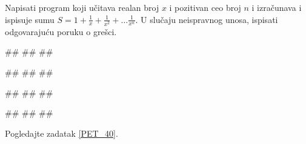 \begin{Exercise}[label=PET_41]
Napisati program koji učitava realan broj $x$ i pozitivan ceo broj $n$ i 
izračunava i ispisuje sumu
$S=1+\frac{1}{x}+\frac{1}{x^2}+\ldots\frac{1}{x^n}$.
U slučaju neispravnog unosa, ispisati odgovarajuću poruku o grešci.

\begin{miditest}
\begin{upotreba}{1}
#\naslovInt#
##
##
\end{upotreba}
\end{miditest}
\begin{miditest}
\begin{upotreba}{2}
#\naslovInt#
##
##
\end{upotreba}
\end{miditest}

\begin{miditest}
\begin{upotreba}{3}
#\naslovInt#
##
##
\end{upotreba}
\end{miditest}
\begin{miditest}
\begin{upotreba}{4}
#\naslovInt#
##
##
\end{upotreba}
\end{miditest}

\end{Exercise}
\ifresenja
\begin{Answer}[ref=PET_41]
Pogledajte zadatak \ref{PET_40}.
\end{Answer}
\fi


